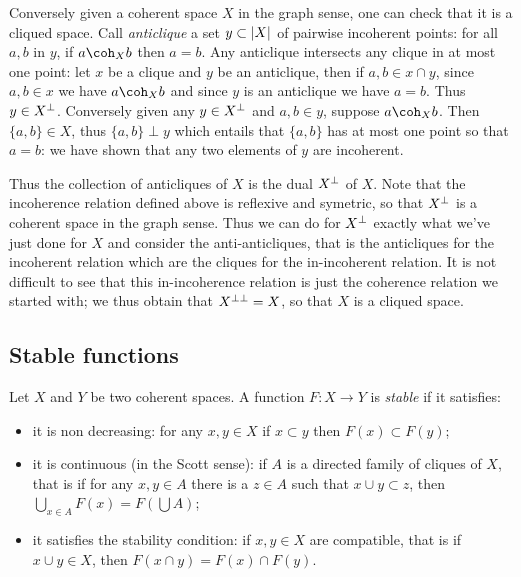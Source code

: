 Conversely given a coherent space \(X\) in the graph sense, one can
check that it is a cliqued space. Call \emph{anticlique} a set
\(y\subset \left|X\right|\) of pairwise incoherent points: for all \(a, b\) in
\(y\), if \(a\coh_X b\) then \(a=b\). Any anticlique intersects any
clique in at most one point: let \(x\) be a clique and \(y\) be an
anticlique, then if \(a,b\in x\cap y\), since \(a, b\in x\) we have
\(a\coh_X b\) and since \(y\) is an anticlique we have \(a = b\). Thus
\(y\in X^\bot\). Conversely given any \(y\in X^\bot\) and \(a, b\in y\),
suppose \(a\coh_X b\). Then \(\{a,b\}\in X\), thus \(\{a,b\}\perp y\)
which entails that \(\{a, b\}\) has at most one point so that \(a = b\):
we have shown that any two elements of \(y\) are incoherent.

Thus the collection of anticliques of \(X\) is the dual \(X^\bot\) of
\(X\). Note that the incoherence relation defined above is reflexive and
symetric, so that \(X^\bot\) is a coherent space in the graph sense.
Thus we can do for \(X^\bot\) exactly what we've just done for \(X\) and
consider the anti-anticliques, that is the anticliques for the
incoherent relation which are the cliques for the in-incoherent
relation. It is not difficult to see that this in-incoherence relation
is just the coherence relation we started with; we thus obtain that
\(X^{\bot\bot} = X\), so that \(X\) is a cliqued space.

\subsection{Stable functions}\label{stable-functions}

\begin{definition}
Let $X$ and $Y$ be two coherent spaces. A function $F:X\longrightarrow Y$ is \emph{stable} if it satisfies:
\begin{itemize}
\item it is non decreasing: for any $x,y\in X$ if $x\subset y$ then $F(x)\subset F(y)$;
\item it is continuous (in the Scott sense): if $A$ is a directed family of cliques of $X$, that is if for any $x,y\in A$ there is a $z\in A$ such that $x\cup y\subset z$, then $\bigcup_{x\in A}F(x) = F(\bigcup A)$;
\item it satisfies the stability condition: if $x,y\in X$ are compatible, that is if $x\cup y\in X$, then $F(x\cap y) = F(x)\cap F(y)$.
\end{itemize}
\end{definition}


